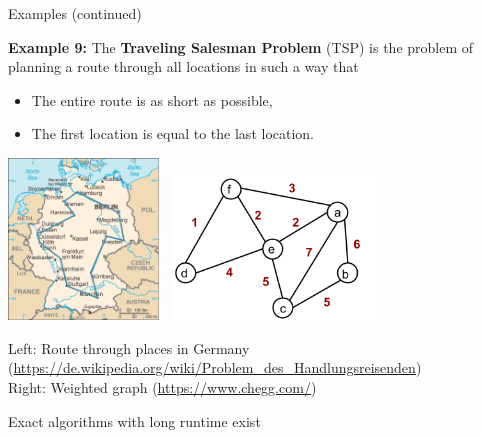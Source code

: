 \documentclass[11pt,compress,t,notes=noshow, xcolor=table]{beamer}
\begin{document}
\begin{vbframe}{Examples (continued)}


\framebreak


\textbf{Example 9:} The \textbf{Traveling Salesman Problem} (TSP) is the problem of planning a route through all locations in such a way that

\begin{itemize}
\item The entire route is as short as possible,
\item The first location is equal to the last location.
\end{itemize}

\vspace*{-0.2cm}

\begin{center}
  \includegraphics[width=0.3\textwidth]{figure_man/tsp.png}~~\includegraphics[width=0.4\textwidth]{figure_man/weighted-graph.png}
\end{center}
\vspace*{-0.2cm}

\begin{footnotesize}
Left: Route through places in Germany (\url{https://de.wikipedia.org/wiki/Problem_des_Handlungsreisenden}) \\
Right: Weighted graph (\url{https://www.chegg.com/})
\end{footnotesize}

\framebreak

Exact algorithms with long runtime exist


\end{vbframe}
\end{document}

